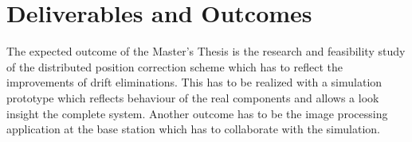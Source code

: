 \chapter{Deliverables and Outcomes}

The expected outcome of the Master's Thesis is the research and feasibility study
of the distributed position correction scheme which has to reflect the
improvements of drift eliminations. This has to be realized with a simulation
prototype which reflects behaviour of the real components and allows a look
insight the complete system. Another outcome has to be the image processing
application at the base station which has to collaborate with the simulation.

